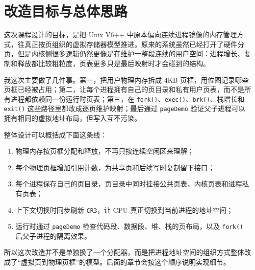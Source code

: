 \chapter{改造目标与总体思路}\label{chap:goal}

这次课程设计的目标，是把 Unix V6++ 中原本偏向连续进程镜像的内存管理方式，往真正按页组织的虚拟存储器模型推进。原来的系统虽然已经打开了硬件分页，但是内核侧很多逻辑仍然更像是在维护一整段连续的用户空间：进程增长、复制和释放都比较粗粒度，页表更多只是最后映射时才会碰到的结构。

我这次主要做了几件事。第一，把用户物理内存拆成 4KB 页框，用位图记录哪些页框已经被占用；第二，让每个进程拥有自己的页目录和私有用户页表，而不是所有进程都依赖同一份运行时页表；第三，在 \texttt{fork()}、\texttt{exec()}、\texttt{brk()}、栈增长和 \texttt{exit()} 这些路径里都改成逐页维护映射；最后通过 \texttt{pageDemo} 验证父子进程可以拥有相同的虚拟地址布局，但写入互不污染。

整体设计可以概括成下面这条线：

\begin{enumerate}
  \item 物理内存按页框分配和释放，不再只按连续空闲区来理解；
  \item 每个物理页框增加引用计数，为共享页和后续写时复制留下接口；
  \item 每个进程保存自己的页目录，页目录中同时挂接公共页表、内核页表和进程私有页表；
  \item 上下文切换时同步刷新 \texttt{CR3}，让 CPU 真正切换到当前进程的地址空间；
  \item 运行时通过 \texttt{pageDemo} 检查代码段、数据段、堆、栈的页布局，以及 \texttt{fork()} 后父子进程的隔离效果。
\end{enumerate}

所以这次改造并不是单独换了一个分配器，而是把进程地址空间的组织方式整体改成了“虚拟页到物理页框”的模型。后面的章节会按这个顺序说明实现细节。
